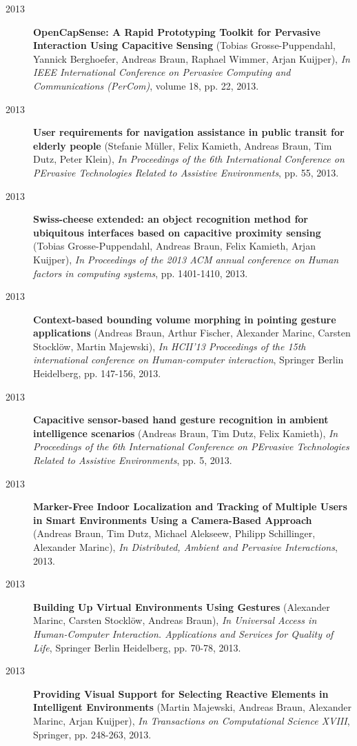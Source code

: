 \begin{appendix}
\begin{description}
\item[2013]{\bf OpenCapSense: A Rapid Prototyping Toolkit for Pervasive Interaction Using Capacitive Sensing} (Tobias Grosse-Puppendahl, Yannick Berghoefer, Andreas Braun, Raphael Wimmer, Arjan Kuijper), {\em In IEEE International Conference on Pervasive Computing and Communications (PerCom)}, volume 18, pp. 22, 2013.
\item[2013]{\bf User requirements for navigation assistance in public transit for elderly people} (Stefanie Müller, Felix Kamieth, Andreas Braun, Tim Dutz, Peter Klein), {\em In Proceedings of the 6th International Conference on PErvasive Technologies Related to Assistive Environments}, pp. 55, 2013.
\item[2013]{\bf Swiss-cheese extended: an object recognition method for ubiquitous interfaces based on capacitive proximity sensing} (Tobias Grosse-Puppendahl, Andreas Braun, Felix Kamieth, Arjan Kuijper), {\em In Proceedings of the 2013 ACM annual conference on Human factors in computing systems}, pp. 1401-1410, 2013.
\item[2013]{\bf Context-based bounding volume morphing in pointing gesture applications} (Andreas Braun, Arthur Fischer, Alexander Marinc, Carsten Stocklöw, Martin Majewski), {\em In HCII'13 Proceedings of the 15th international conference on Human-computer interaction}, Springer Berlin Heidelberg, pp. 147-156, 2013.
\item[2013]{\bf Capacitive sensor-based hand gesture recognition in ambient intelligence scenarios} (Andreas Braun, Tim Dutz, Felix Kamieth), {\em In Proceedings of the 6th International Conference on PErvasive Technologies Related to Assistive Environments}, pp. 5, 2013.
\item[2013]{\bf Marker-Free Indoor Localization and Tracking of Multiple Users in Smart Environments Using a Camera-Based Approach} (Andreas Braun, Tim Dutz, Michael Alekseew, Philipp Schillinger, Alexander Marinc), {\em In Distributed, Ambient and Pervasive Interactions}, 2013.
\item[2013]{\bf Building Up Virtual Environments Using Gestures} (Alexander Marinc, Carsten Stocklöw, Andreas Braun), {\em In Universal Access in Human-Computer Interaction. Applications and Services for Quality of Life}, Springer Berlin Heidelberg, pp. 70-78, 2013.
\item[2013]{\bf Providing Visual Support for Selecting Reactive Elements in Intelligent Environments} (Martin Majewski, Andreas Braun, Alexander Marinc, Arjan Kuijper), {\em In Transactions on Computational Science XVIII}, Springer, pp. 248-263, 2013.

\end{description}
\end{appendix}
